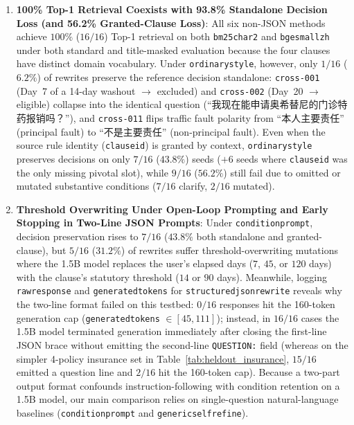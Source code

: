 \documentclass[10pt,twocolumn]{article}
\renewcommand{\_}{\textunderscore\allowbreak}
\begin{document}
\begin{enumerate}[leftmargin=*,nosep]
  \item \textbf{100\% Top-1 Retrieval Coexists with 93.8\% Standalone Decision Loss (and 56.2\% Granted-Clause Loss)}: All six non-JSON methods achieve $100\%$ ($16/16$) Top-1 retrieval on both \texttt{bm25\_char2} and \texttt{bge\_small\_zh} under both standard and title-masked evaluation because the four clauses have distinct domain vocabulary. Under \texttt{ordinary\_style}, however, only $1/16$ ($6.2\%$) of rewrites preserve the reference decision standalone: \texttt{cross-001} (Day~7 of a 14-day washout $\rightarrow$ excluded) and \texttt{cross-002} (Day~20 $\rightarrow$ eligible) collapse into the identical question (``我现在能申请奥希替尼的门诊特药报销吗？''), and \texttt{cross-011} flips traffic fault polarity from ``本人主要责任'' (principal fault) to ``不是主要责任'' (non-principal fault). Even when the source rule identity (\texttt{clause\_id}) is granted by context, \texttt{ordinary\_style} preserves decisions on only $7/16$ ($43.8\%$) seeds ($+6$ seeds where \texttt{clause\_id} was the only missing pivotal slot), while $9/16$ ($56.2\%$) still fail due to omitted or mutated substantive conditions ($7/16$ clarify, $2/16$ mutated).
  \item \textbf{Threshold Overwriting Under Open-Loop Prompting and Early Stopping in Two-Line JSON Prompts}: Under \texttt{condition\_prompt}, decision preservation rises to $7/16$ ($43.8\%$ both standalone and granted-clause), but $5/16$ ($31.2\%$) of rewrites suffer threshold-overwriting mutations where the 1.5B model replaces the user's elapsed days ($7$, $45$, or $120$ days) with the clause's statutory threshold ($14$ or $90$ days). Meanwhile, logging \texttt{raw\_response} and \texttt{generated\_tokens} for \texttt{structured\_json\_rewrite} reveals why the two-line format failed on this testbed: $0/16$ responses hit the 160-token generation cap (\texttt{generated\_tokens} $\in [45, 111]$); instead, in $16/16$ cases the 1.5B model terminated generation immediately after closing the first-line JSON brace without emitting the second-line \texttt{QUESTION:} field (whereas on the simpler 4-policy insurance set in Table~\ref{tab:heldout_insurance}, $15/16$ emitted a question line and $2/16$ hit the 160-token cap). Because a two-part output format confounds instruction-following with condition retention on a 1.5B model, our main comparison relies on single-question natural-language baselines (\texttt{condition\_prompt} and \texttt{generic\_self\_refine}).

\end{enumerate}
\end{document}
